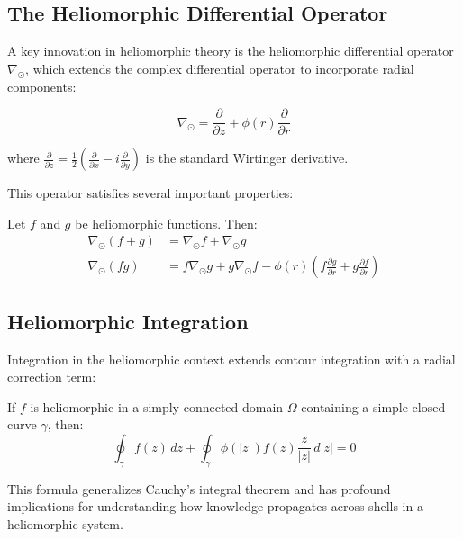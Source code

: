 \subsection{The Heliomorphic Differential Operator}

A key innovation in heliomorphic theory is the heliomorphic differential operator $\nabla_{\odot}$, which extends the complex differential operator to incorporate radial components:

\begin{equation}
\nabla_{\odot} = \frac{\partial}{\partial z} + \phi(r) \frac{\partial}{\partial r}
\end{equation}

where $\frac{\partial}{\partial z} = \frac{1}{2}\left(\frac{\partial}{\partial x} - i\frac{\partial}{\partial y}\right)$ is the standard Wirtinger derivative.

This operator satisfies several important properties:

\begin{proposition}
Let $f$ and $g$ be heliomorphic functions. Then:
\begin{align}
\nabla_{\odot}(f + g) &= \nabla_{\odot}f + \nabla_{\odot}g \\
\nabla_{\odot}(fg) &= f\nabla_{\odot}g + g\nabla_{\odot}f - \phi(r)(f\frac{\partial g}{\partial r} + g\frac{\partial f}{\partial r})
\end{align}
\end{proposition}

\subsection{Heliomorphic Integration}

Integration in the heliomorphic context extends contour integration with a radial correction term:

\begin{theorem}
If $f$ is heliomorphic in a simply connected domain $\Omega$ containing a simple closed curve $\gamma$, then:
\begin{equation}
\oint_{\gamma} f(z) \, dz + \oint_{\gamma} \phi(|z|) f(z) \frac{z}{|z|} \, d|z| = 0
\end{equation}
\end{theorem}

This formula generalizes Cauchy's integral theorem and has profound implications for understanding how knowledge propagates across shells in a heliomorphic system.

